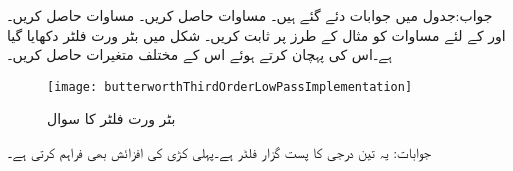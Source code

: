 جواب:جدول  میں جوابات دئے گئے ہیں۔
مساوات  حاصل کریں۔
مساوات  حاصل کریں۔
 اور  کے لئے مساوات  کو مثال  کے طرز پر ثابت کریں۔
شکل  میں بٹر ورت فلٹر دکھایا گیا ہے۔اس کی پہچان کرتے ہوئے اس کے مختلف متغیرات حاصل کریں۔
\begin{figure}
\centering
\texttt{[image: butterworthThirdOrderLowPassImplementation]}
\caption{بٹر ورت فلٹر کا سوال}
\label{شکل_تعددی_ردعمل_سوال_تین_درجی_بٹر_ورت_فلٹر}
\end{figure}
جوابات: یہ تین درجی  کا پست گزار فلٹر ہے۔پہلی کڑی  کی افزائش بھی فراہم کرتی ہے۔
